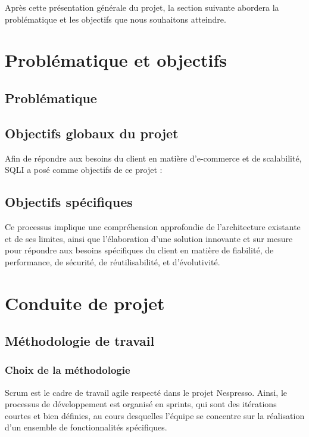 \vspace{0.5cm}
Après cette présentation générale du projet, la section suivante abordera la problématique et les objectifs que nous souhaitons atteindre.

\section{Problématique et objectifs}
\subsection{Problématique}

\subsection{Objectifs globaux du projet}
Afin de répondre aux besoins du client en matière d'e-commerce et de scalabilité, SQLI a posé comme objectifs de ce projet : 


\subsection{Objectifs spécifiques}


Ce processus implique une compréhension approfondie de l'architecture existante et de ses limites, ainsi que l'élaboration d'une solution innovante et sur mesure pour répondre aux besoins spécifiques du client en matière de fiabilité, de performance, de sécurité, de réutilisabilité, et d'évolutivité.

\section{Conduite de projet}
 
\subsection{Méthodologie de travail}

\subsubsection{Choix de la méthodologie}

Scrum \cite{scrum} est le cadre de travail agile respecté dans le projet Nespresso. Ainsi, le processus de développement est organisé en sprints, qui sont des itérations courtes et bien définies, au cours desquelles l'équipe se concentre sur la réalisation d'un ensemble de fonctionnalités spécifiques. \par 


